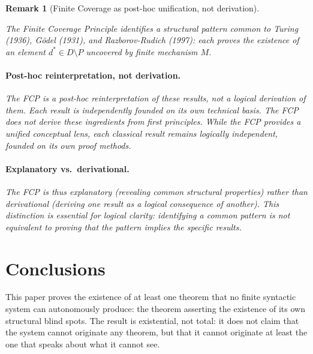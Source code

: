\documentclass[11pt]{article}
\newtheorem{remark}[theorem]{Remark}
\begin{document}
\begin{remark}[Finite Coverage as post-hoc unification, not derivation]
  \label{rem:fcp-unification}
  
  The Finite Coverage Principle identifies a 
  structural pattern common to Turing (1936), Gödel (1931), 
  and Razborov-Rudich (1997): each proves the existence of 
  an element $d^* \in D \setminus P$ uncovered by finite mechanism $M$.
  
  \paragraph{Post-hoc reinterpretation, not derivation.}
  The FCP is a \emph{post-hoc reinterpretation} of these 
  results, not a logical derivation of them. Each result is 
  independently founded on its own technical basis.  
  The FCP does not derive these ingredients from first 
  principles. While the FCP provides a unified 
  conceptual lens, each classical result remains logically 
  independent, founded on its own proof methods.
  
  \paragraph{Explanatory vs.\ derivational.}
  The FCP is thus \emph{explanatory} (revealing common structural properties) 
  rather than \emph{derivational} (deriving one result as a logical consequence of another). 
  This distinction is essential for logical clarity: identifying a common pattern 
  is not equivalent to proving that the pattern implies the specific results.
  
\end{remark}

  

\section{Conclusions}
\label{sec:conclusions}

This paper proves the existence of at least one theorem that no finite
syntactic system can autonomously produce: the theorem asserting the
existence of its own structural blind spots. The result is existential,
not total: it does not claim that the system cannot originate any
theorem, but that it cannot originate at least the one that speaks 
about what it cannot see.


\medskip
\end{document}
